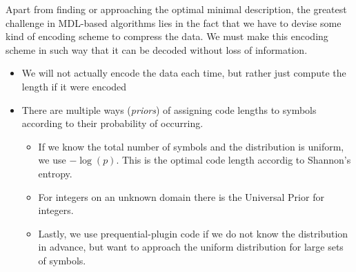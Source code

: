 \documentclass{llncs}
\begin{document}
Apart from finding or approaching the optimal minimal description, the greatest challenge in MDL-based algorithms lies in the fact that we have to devise some kind of encoding scheme to compress the data. We must make this encoding scheme in such way that it can be decoded without loss of information.
\begin{itemize}
\item We will not actually encode the data each time, but rather just compute the length if it were encoded
\item There are multiple ways (\emph{priors}) of assigning code lengths to symbols according to their probability of occurring. \begin{itemize}
\item If we know the total number of symbols and the distribution is uniform, we use $-\log(p)$. This is the optimal code length accordig to Shannon's entropy. 
\item For integers on an unknown domain there is the Universal Prior for integers. 
\item Lastly, we use prequential-plugin code if we do not know the distribution in advance, but want to approach the uniform distribution for large sets of symbols.
\end{itemize}
\end{itemize}
\end{document}

